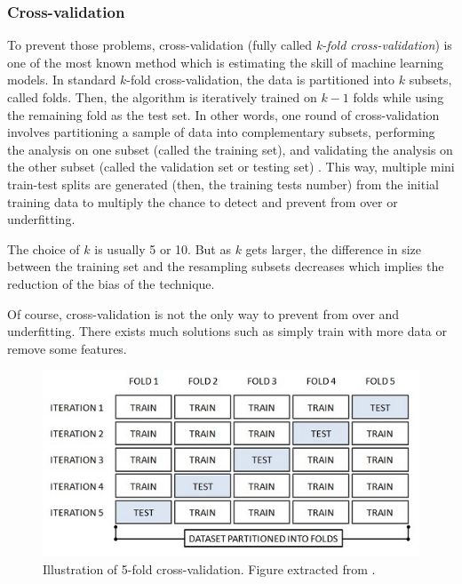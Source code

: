 \documentclass[11pt, openany]{report}
\theoremstyle{plain}
\theoremstyle{definition}
\theoremstyle{remark}
\begin{document}
\subsubsection{Cross-validation}
To prevent those problems, cross-validation (fully called \textit{k-fold cross-validation}) is one of the most known method which is estimating the skill of machine learning models. In standard $k$-fold cross-validation, the data is partitioned into $k$ subsets, called folds. Then, the algorithm is iteratively trained on $k-1$ folds while using the remaining fold as the test set. In other words, one round of cross-validation involves partitioning a sample of data into complementary subsets, performing the analysis on one subset (called the training set), and validating the analysis on the other subset (called the validation set or testing set) \cite{wiki}. This way, multiple mini train-test splits are generated (then, the training tests number) from the initial training data to multiply the chance to detect and prevent from over or underfitting.

The choice of $k$ is usually 5 or 10. But as $k$ gets larger, the difference in size between the training set and the resampling subsets decreases which implies the reduction of the bias of the technique.

Of course, cross-validation is not the only way to prevent from over and underfitting. There exists much solutions such as simply train with more data or remove some features. 


\begin{figure}[h]
  \centering
  \includegraphics[scale=1.3]{figures/cross-validation.jpg}
  \caption{Illustration of 5-fold cross-validation. Figure extracted from \cite{MachineLearningForDummies}.}
  \label{fig:over-under-fit}
\end{figure}
\end{document}

